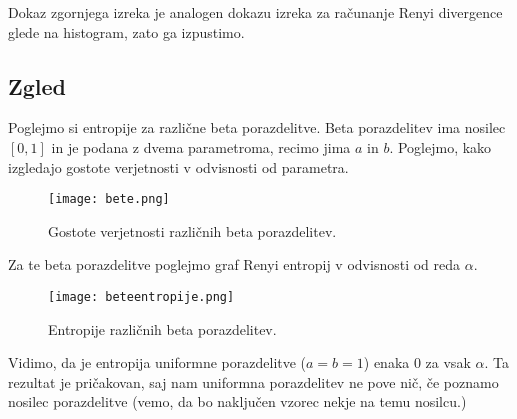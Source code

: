 \begin{opomba}
    Dokaz zgornjega izreka je analogen dokazu izreka za računanje Renyi divergence glede na histogram, zato ga izpustimo.
\end{opomba}

\subsection{Zgled}

Poglejmo si entropije za različne beta porazdelitve. Beta porazdelitev ima nosilec $[0,1]$ in je podana z dvema parametroma, recimo jima $a$ in $b$. Poglejmo, kako izgledajo gostote verjetnosti v odvisnosti od parametra.

\begin{figure}[!h]
    \centering
    \texttt{[image: bete.png]}
    \caption{Gostote verjetnosti različnih beta porazdelitev.}
\end{figure}

Za te beta porazdelitve poglejmo graf Renyi entropij v odvisnosti od reda $\alpha$.

\begin{figure}[!h]
    \centering
    \texttt{[image: beteentropije.png]}
    \caption{Entropije različnih beta porazdelitev.}
\end{figure}

Vidimo, da je entropija uniformne porazdelitve ($a = b = 1$) enaka 0 za vsak $\alpha$. Ta rezultat je pričakovan, saj nam uniformna porazdelitev ne pove nič, če poznamo nosilec porazdelitve (vemo, da bo naključen vzorec nekje na temu nosilcu.)